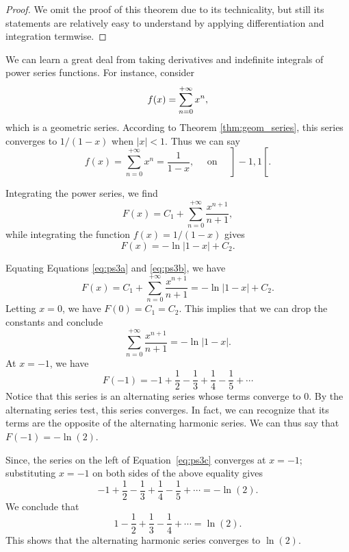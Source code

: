 \begin{proof}
We omit the proof of this theorem due to its technicality, but still its statements are relatively easy to understand by applying differentiation and integration termwise. 
\end{proof}

\fi

We can learn a great deal from taking derivatives and indefinite integrals of power series functions.  For instance, consider 
$$\displaystyle f(x) = \sum_{n=0}^{+\infty} x^n,$$
which is a geometric series. According to Theorem \ref{thm:geom_series}, this series converges to $1/(1-x)$ when $|x|<1$. Thus we can say
$$	f(x) = \sum_{n=0}^{+\infty} x^n = \frac 1{1-x},\quad \text{ on }\quad \left.\right]-1,1\left[\right..$$

Integrating the power series, we find
\begin{equation} F(x)  = C_1+\sum_{n=0}^{+\infty} \frac{x^{n+1}}{n+1},\label{eq:ps3a}\end{equation}
while integrating the function $f(x) = 1/(1-x)$ gives
\begin{equation} F(x)  = -\ln|1-x| + C_2.\label{eq:ps3b}\end{equation}

Equating Equations \eqref{eq:ps3a} and \eqref{eq:ps3b}, we have 
$$F(x) = C_1+\sum_{n=0}^{+\infty} \frac{x^{n+1}}{n+1} = -\ln|1-x| + C_2.$$
Letting $x=0$, we have $F(0) = C_1 = C_2$. This implies that we can drop the constants and conclude
\begin{equation}
\sum_{n=0}^{+\infty} \frac{x^{n+1}}{n+1} = -\ln|1-x|.
\label{eq:ps3c}\end{equation}
At $x=-1$, we have
$$F(-1) = -1+\frac12-\frac13+\frac14-\frac15+\cdots$$
Notice that this series is an alternating series whose terms converge to 0. By the alternating series test, this series converges. In fact, we can recognize that its terms are the opposite of the alternating harmonic series. We can thus say that $F(-1) = -\ln(2)$.

Since,  the series on the left of Equation~\eqref{eq:ps3c} converges at $x=-1$; substituting $x=-1$ on both sides of the above equality gives
$$-1+\frac12-\frac13+\frac14-\frac15+\cdots = -\ln(2).$$
 We conclude that 
$$1-\frac12+\frac13-\frac14+\cdots = \ln(2).$$
This shows that the alternating harmonic series converges to $\ln (2)$. 


